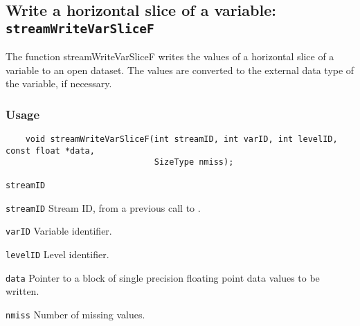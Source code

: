 \subsection{Write a horizontal slice of a variable: \texttt{streamWriteVarSliceF}}
\label{streamWriteVarSliceF}

The function streamWriteVarSliceF writes the values of a horizontal slice of a variable to an open dataset.
The values are converted to the external data type of the variable, if necessary.
\subsubsection*{Usage}

\begin{verbatim}
    void streamWriteVarSliceF(int streamID, int varID, int levelID, const float *data, 
                              SizeType nmiss);
\end{verbatim}

\hspace*{4mm}\begin{minipage}[]{15cm}
\begin{deflist}{\texttt{streamID}\ }
\item[\texttt{streamID}]
Stream ID, from a previous call to {}.
\item[\texttt{varID}]
Variable identifier.
\item[\texttt{levelID}]
Level identifier.
\item[\texttt{data}]
Pointer to a block of single precision floating point data values to be written.
\item[\texttt{nmiss}]
Number of missing values.

\end{deflist}
\end{minipage}
